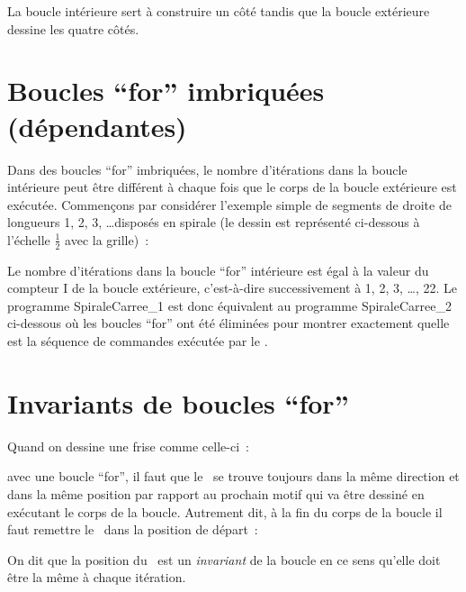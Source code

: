 La boucle intérieure sert à construire un côté tandis que la boucle
ex\-té\-rieu\-re dessine les quatre côtés.

\section{Boucles ``for'' imbriquées (dépendantes)} 

Dans des boucles ``for'' imbriquées, le nombre d'itérations 
dans la boucle in\-té\-rieu\-re peut être dif\-fé\-rent à chaque fois que le corps de
la boucle extérieure est exécutée. Commençons par considérer l'exemple 
simple de segments de droite de longueurs 1, 2, 3, \ldots disposés en spirale
(le dessin est représenté ci-dessous à l'échelle $\frac{1}{2}$ avec la grille)~:\\[5cm]
%
\vspace*{-5cm}%


Le nombre d'itérations dans la boucle ``for'' intérieure est égal à la valeur
du compteur {\idt I} de la boucle extérieure, c'est-à-dire successivement à 1, 2, 
3, \ldots, 22. Le programme {\idt SpiraleCarree\_1} est donc équivalent au
programme {\idt SpiraleCarree\_2} ci-dessous où les boucles ``for'' ont été
éliminées pour montrer exactement quelle est la séquence de commandes exécutée
par le \robot.



\section{Invariants de boucles ``for''} 

Quand on dessine une frise comme celle-ci~:\\[9mm]
%
\vspace*{-9mm}%

\noindent avec une boucle ``for'', il faut que le \robot\ se trouve toujours dans 
la même direction
et dans la même position par rapport au prochain motif qui va être 
dessiné en exécutant 
le corps de la boucle. Autrement dit, à la fin du corps de la 
boucle il faut 
remettre le \robot\ dans la position de départ~:

On dit que la position du \robot\ est un {\em invariant} de la boucle en ce sens
qu'elle doit être la même à chaque itération.

